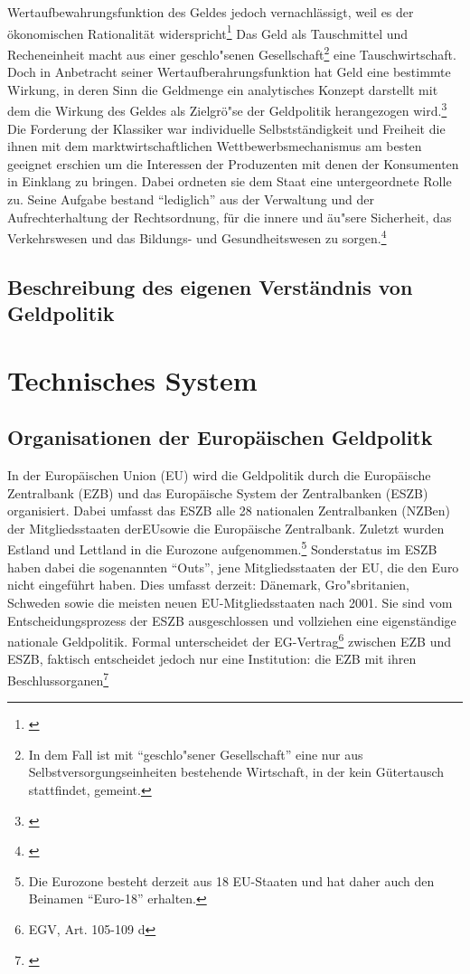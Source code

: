 \documentclass[
        onecolumn,
        a4paper,
        abstracton,
        parskip=half
        ,final
        ]{scrartcl}
\begin{document}
Wertaufbewahrungsfunktion des Geldes jedoch vernachl{\"a}ssigt, weil es der {\"o}konomischen Rationalit{\"a}t widerspricht\footnote[17]{\citep*[S.53]{bombach1981theorie}} Das Geld als Tauschmittel und Recheneinheit macht aus einer geschlo{"s}enen Gesellschaft\footnote[18]{In dem Fall ist mit "`geschlo{"s}ener Gesellschaft"' eine nur aus Selbstversorgungseinheiten bestehende Wirtschaft, in der kein G{\"u}tertausch stattfindet, gemeint.} eine Tauschwirtschaft. Doch in Anbetracht seiner Wertaufberahrungsfunktion hat Geld eine bestimmte Wirkung, in deren Sinn die Geldmenge ein analytisches Konzept darstellt mit dem die Wirkung des Geldes als Zielgr{\"o}{"s}e der Geldpolitik herangezogen wird.\footnote[19]{\citep*[S.421]{Basseler2010}} Die Forderung der Klassiker war individuelle Selbstst{\"a}ndigkeit und Freiheit die ihnen mit dem marktwirtschaftlichen Wettbewerbsmechanismus am besten geeignet erschien um die Interessen der Produzenten mit denen der Konsumenten in Einklang zu bringen. Dabei ordneten sie dem Staat eine untergeordnete Rolle zu. Seine Aufgabe bestand "`lediglich"' aus der Verwaltung und der Aufrechterhaltung der Rechtsordnung, f{\"u}r die innere und {\"a}u{"s}ere Sicherheit, das Verkehrswesen und das Bildungs- und Gesundheitswesen zu sorgen.\footnote[20]{\citep*[S.60f]{Basseler2010}}


\subsection{Beschreibung des eigenen Verst{\"a}ndnis von Geldpolitik}




\section{Technisches System}
  \label{sec2:technischesSystem}

\subsection{Organisationen der Europ{\"a}ischen Geldpolitk}

In der Europ{\"a}ischen Union (EU) wird die Geldpolitik durch die Europ{\"a}ische Zentralbank (EZB) und das Europ{\"a}ische System der Zentralbanken (\ac{ESZB}) organisiert. Dabei umfasst das ESZB alle 28 nationalen Zentralbanken (NZBen) der Mitgliedsstaaten der\ac{EU}sowie die Europ{\"a}ische Zentralbank. Zuletzt wurden Estland und Lettland in die Eurozone aufgenommen.\footnote[98]{Die Eurozone besteht derzeit aus 18 EU-Staaten und hat daher auch den Beinamen "`Euro-18"' erhalten.} Sonderstatus im ESZB haben dabei die sogenannten "`Outs"', jene Mitgliedsstaaten der EU, die den Euro nicht eingef{\"u}hrt haben.
Dies umfasst derzeit: D{\"a}nemark, Gro{"s}britanien, Schweden sowie die meisten neuen EU-Mitgliedsstaaten nach 2001. Sie sind vom Entscheidungsprozess der ESZB ausgeschlossen und vollziehen eine eigenst{\"a}ndige nationale Geldpolitik.
Formal unterscheidet der EG-Vertrag\footnote[25]{\ac{EGV}, Art. 105-109 d} zwischen EZB und ESZB, faktisch entscheidet jedoch nur eine Institution: die EZB mit ihren Beschlussorganen\footnote[99]{\citep*[vgl.][S.553]{Basseler2010}}
\end{document}
